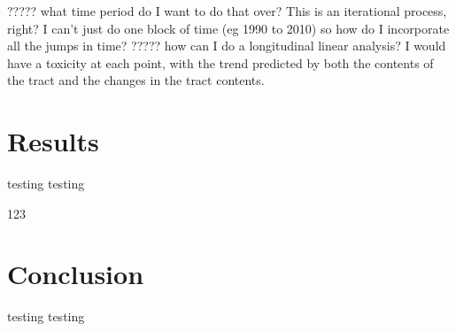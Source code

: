 \documentclass[12pt,twoside]{dukestatscithesis}
\theoremstyle{definition}
\theoremstyle{definition}
\theoremstyle{definition}
\theoremstyle{remark}
\begin{document}
????? what time period do I want to do that over? This is an iterational
process, right? I can't just do one block of time (eg 1990 to 2010) so
how do I incorporate all the jumps in time? ????? how can I do a
longitudinal linear analysis? I would have a toxicity at each point,
with the trend predicted by both the contents of the tract and the
changes in the tract contents.
\begin{Shaded}
\begin{Highlighting}[]
\StringTok{ }\NormalTok{(}\NormalTok{, }\NormalTok{, }\NormalTok{, }\NormalTok{, }\NormalTok{)}
\StringTok{ }
\StringTok{ }
\StringTok{ }
\StringTok{ }\StringTok{ } \NormalTok{+}\StringTok{ }\StringTok{ }\StringTok{ }\StringTok{ }\StringTok{ } 

\StringTok{ }
\StringTok{ }
\StringTok{ }
\StringTok{ }\StringTok{ } \NormalTok{+}\StringTok{ }\StringTok{ }\StringTok{ }\StringTok{ }\StringTok{ } 
\end{Highlighting}
\end{Shaded}
\chapter{Results}\label{organization}

testing testing

123

\chapter*{Conclusion}\label{conclusion}

testing testing
\end{document}
